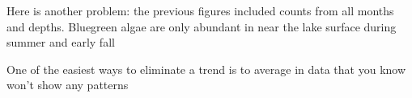 \documentclass[10pt]{beamer}
\begin{document}
\begin{frame}
\begin{center}
\end{center}

\vspace{-2ex}
{\scriptsize Here is another problem: the previous figures
  included counts from all months and depths.  Bluegreen algae
  are only abundant in near the lake surface during summer and early fall\\}

\vspace{0.5ex}
{\scriptsize \color{red} One
  of the easiest ways to eliminate a trend is to average in data that you know
  won't show any patterns\\}
\end{frame}
\end{document}
